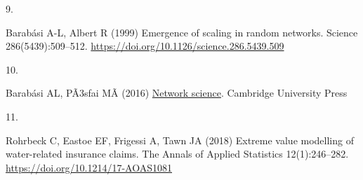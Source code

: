 \documentclass[
  10pt,
  a4paper,
]{scrreprt}
\newlength{\cslhangindent}
\newlength{\csllabelwidth}
\newlength{\cslentryspacingunit} %
\newenvironment{CSLReferences}[2] %
 {%
  \setlength{\parindent}{0pt}
  \ifodd #1
  \let\oldpar\par
  \def\par{\hangindent=\cslhangindent\oldpar}
  \fi
  \setlength{\parskip}{#2\cslentryspacingunit}
 }%
 {}
\newcommand{\CSLLeftMargin}[1]{\parbox[t]{\csllabelwidth}{#1}}
\newcommand{\CSLRightInline}[1]{\parbox[t]{\linewidth - \csllabelwidth}{#1}\break}
\theoremstyle{definition}
\theoremstyle{plain}
\theoremstyle{plain}
\theoremstyle{plain}
\theoremstyle{remark}
\begin{document}
{\begin{CSLReferences}{0}{0}
\leavevmode{}%
\CSLLeftMargin{9. }%
\CSLRightInline{Barabási A-L, Albert R (1999) Emergence of scaling in
random networks. Science 286(5439):509--512.
\url{https://doi.org/10.1126/science.286.5439.509}}

\leavevmode{}%
\CSLLeftMargin{10. }%
\CSLRightInline{Barabási AL, PÃ3sfai MÃ (2016)
\href{https://books.google.co.uk/books?id=iLtGDQAAQBAJ}{Network
science}. Cambridge University Press}

\leavevmode{}%
\CSLLeftMargin{11. }%
\CSLRightInline{Rohrbeck C, Eastoe EF, Frigessi A, Tawn JA (2018)
{Extreme value modelling of water-related insurance claims}. The Annals
of Applied Statistics 12(1):246--282.
\url{https://doi.org/10.1214/17-AOAS1081}}

\end{CSLReferences}
\end{document}

